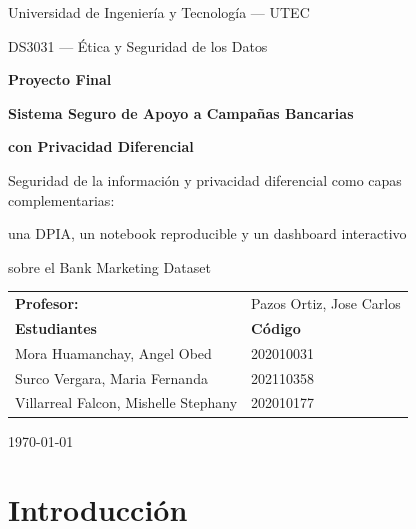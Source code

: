 \documentclass[11pt,a4paper]{article}
\begin{document}
\renewcommand{\tablename}{Cuadro}
\renewcommand{\figurename}{Figura}

\begin{titlepage}
\centering
\vspace*{1.5cm}
{\large Universidad de Ingeniería y Tecnología --- UTEC\par}
{\large DS3031 --- Ética y Seguridad de los Datos\par}
\vspace{1.2cm}
{\Large\bfseries Proyecto Final\par}
\vspace{0.4cm}
{\Large\bfseries Sistema Seguro de Apoyo a Campañas Bancarias\par}
{\Large\bfseries con Privacidad Diferencial\par}
\vspace{1.6cm}
{\large Seguridad de la información y privacidad diferencial como capas complementarias:\par}
{\large una DPIA, un notebook reproducible y un dashboard interactivo\par}
{\large sobre el Bank Marketing Dataset\par}
\vspace{2cm}

\begin{tabular}{ll}
\textbf{Profesor:} & Pazos Ortiz, Jose Carlos \\[0.3cm]
\textbf{Estudiantes} & \textbf{Código} \\
Mora Huamanchay, Angel Obed & 202010031 \\
Surco Vergara, Maria Fernanda & 202110358 \\
Villarreal Falcon, Mishelle Stephany & 202010177 \\
\end{tabular}

\vfill
{\large \today\par}
\end{titlepage}

\tableofcontents
\newpage

\section{Introducción}
\end{document}
